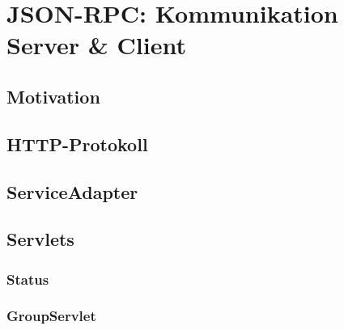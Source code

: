 
\section{JSON-RPC: Kommunikation Server \& Client}
	\subsection{Motivation}
	\subsection{HTTP-Protokoll}
	\subsection{ServiceAdapter}
	\subsection{Servlets}
	\subsubsection{Status}
	\subsubsection{GroupServlet}
	\newpage